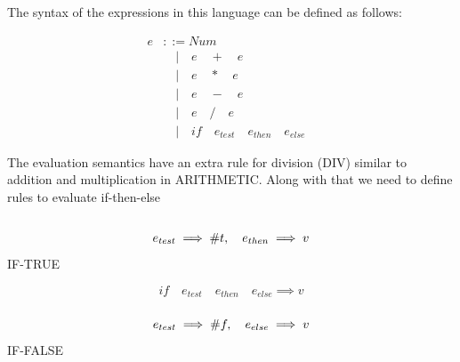     The syntax of the expressions in this language can be defined as follows:
    
    
    \begin{align}
    e & ::= Num&\\
         & \quad |\quad e \quad + \quad e&\\
         & \quad |\quad e \quad * \quad e&\\
         & \quad |\quad e \quad - \quad e&\\
         & \quad |\quad e \quad / \quad e&\\
         & \quad |\quad if \quad e_{test} \quad e_{then} \quad e_{else}
    \end{align}

    The evaluation semantics have an extra rule for division (DIV) similar to addition and multiplication in ARITHMETIC. Along with that we need to define rules to evaluate if-then-else

    $$$$
    $$$$
    
    \begin{displaymath}
             e_{test} \implies \#t, \quad e_{then} \implies v \\
    \end{displaymath}
    \quad\quad\quad\quad\quad\quad\quad
    \textemdash\textemdash\textemdash\textemdash\textemdash\textemdash\textemdash\textemdash\textemdash\textemdash\textemdash\textemdash\textemdash\textemdash\textemdash\textemdash\textemdash\textemdash\textemdash\textemdash IF-TRUE

    \begin{displaymath}
        if \quad e_{test} \quad e_{then} \quad e_{else} \implies v
    \end{displaymath}

    $$$$
    \begin{displaymath}
             e_{test} \implies \#f, \quad e_{else} \implies v \\
    \end{displaymath}
    \quad\quad\quad\quad\quad\quad\quad
    \textemdash\textemdash\textemdash\textemdash\textemdash\textemdash\textemdash\textemdash\textemdash\textemdash\textemdash\textemdash\textemdash\textemdash\textemdash\textemdash\textemdash\textemdash\textemdash\textemdash IF-FALSE

